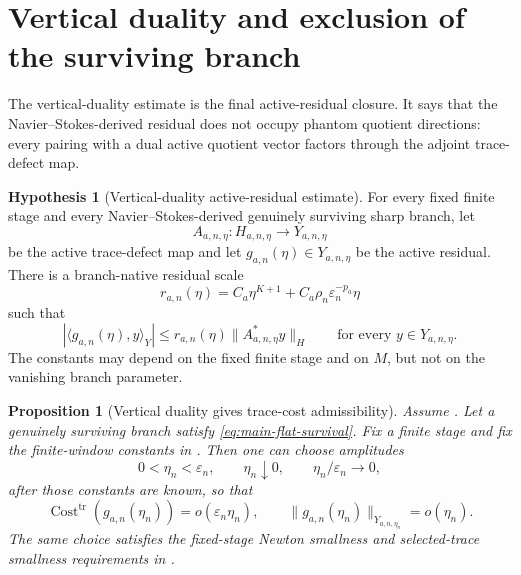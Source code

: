 \documentclass[11pt]{article}
\numberwithin{equation}{section}
\theoremstyle{plain}
\newtheorem{proposition}{Proposition}[section]
\theoremstyle{definition}
\newtheorem{hypothesis}{Hypothesis}[section]
\theoremstyle{remark}
\DeclareMathOperator{\Cost}{Cost}
\newcommand{\eps}{\varepsilon}
\newcommand{\tr}{\operatorname{tr}}
\begin{document}
\section{Vertical duality and exclusion of the surviving branch}\label{sec:main-vertical-duality}

The vertical-duality estimate is the final active-residual closure.  It says that the Navier--Stokes-derived residual does not occupy phantom quotient directions: every pairing with a dual active quotient vector factors through the adjoint trace-defect map.

\begin{hypothesis}[Vertical-duality active-residual estimate]\label{hyp:main-VD}
For every fixed finite stage and every Navier--Stokes-derived genuinely surviving sharp branch, let
\[
        A_{a,n,\eta}:H_{a,n,\eta}\to Y_{a,n,\eta}
\]
be the active trace-defect map and let \(g_{a,n}(\eta)\in Y_{a,n,\eta}\) be the active residual.  There is a branch-native residual scale
\begin{equation}\label{eq:main-branch-native-scale}
        r_{a,n}(\eta)=C_a\eta^{K+1}+C_a\rho_n\eps_n^{-p_a}\eta
\end{equation}
such that
\begin{equation}\label{eq:main-VD}
        |\langle g_{a,n}(\eta),y\rangle_Y|
        \le r_{a,n}(\eta)\|A^*_{a,n,\eta}y\|_H
        \qquad \text{for every }y\in Y_{a,n,\eta}.
\end{equation}
The constants may depend on the fixed finite stage and on \(M\), but not on the vanishing branch parameter.
\end{hypothesis}

\begin{proposition}[Vertical duality gives trace-cost admissibility]\label{prop:main-vd-admissible}
Assume .  Let a genuinely surviving branch satisfy \eqref{eq:main-flat-survival}.  Fix a finite stage and fix the finite-window constants in .  Then one can choose amplitudes
\[
        0<\eta_n<\eps_n,
        \qquad \eta_n\downarrow0,
        \qquad \eta_n/\eps_n\to0,
\]
after those constants are known, so that
\begin{equation}\label{eq:main-admissible}
        \Cost^{\tr}(g_{a,n}(\eta_n))=o(\eps_n\eta_n),
        \qquad
        \|g_{a,n}(\eta_n)\|_{Y_{a,n,\eta_n}}=o(\eta_n).
\end{equation}
The same choice satisfies the fixed-stage Newton smallness and selected-trace smallness requirements in .
\end{proposition}
\end{document}
